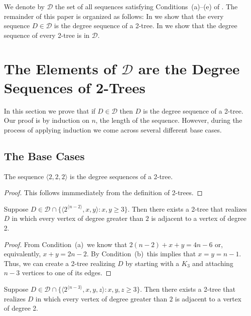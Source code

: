 \documentclass[lotsofwhite,charterfonts]{patmorin}
\newcommand{\rep}[1]{^{\langle#1\rangle}}
\newcommand{\degreesum}{Condition~(a)}
\newcommand{\maxdegree}{Condition~(b)}
\begin{document}
We denote by $\mathcal{D}$ the set of all sequences satisfying
Conditions~(a)--(e) of .  The remainder of this paper is
organized as follows:  In  we show that the every sequence
$D\in \mathcal{D}$ is the degree sequence of a 2-tree.  In
 we show that the degree sequence of every 2-tree is
in $\mathcal{D}$.

\section{The Elements of $\mathcal{D}$ are the Degree Sequences of
	2-Trees}

In this section we prove that if $D\in \mathcal{D}$ then $D$ is the
degree sequence of a 2-tree.  Our proof is by induction on $n$, the
length of the sequence.  However, during the process of applying
induction we come across several different base cases.

\subsection{The Base Cases}

\begin{lem}
The sequence $\langle 2,2,2\rangle$ is the degree sequences of a 2-tree.
\end{lem}

\begin{proof}
This follows immmediately from the definition of 2-trees.
\end{proof}


\begin{lem}
Suppose $D\in \mathcal{D}\cap \{\langle 2\rep{n-2},x,y\rangle:
x,y\ge 3\}$. 
Then there exists a 2-tree that realizes $D$ in which every vertex of
degree greater than $2$ is adjacent to a vertex of degree 2.
\end{lem}

\begin{proof}
From \degreesum\ we know that $2(n-2)+x+y=4n-6$ or, equivalently,
$x+y=2n-2$.  By \maxdegree\ this implies that $x=y=n-1$.  Thus,
we can create a 2-tree realizing $D$ by starting with a $K_3$ and
attaching $n-3$ vertices to one of its edges.
\end{proof}

\begin{lem}
Suppose $D\in \mathcal{D}\cap \{\langle 2\rep{n-3},x,y,z\rangle:
x,y,z\ge 3\}$. 
Then there exists a 2-tree that realizes $D$ in which every vertex of
degree greater than $2$ is adjacent to a vertex of degree 2.
\end{lem}
\end{document}
